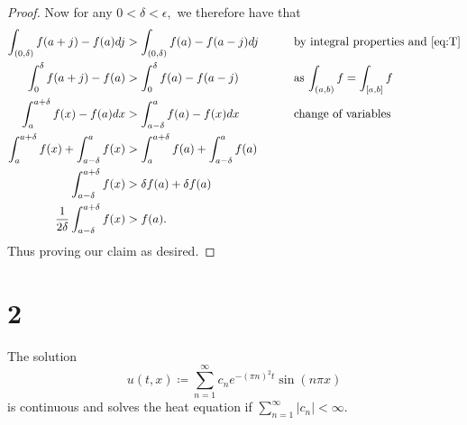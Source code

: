 \documentclass[10pt]{article}
\begin{document}
\begin{proof}
    Now for any $0<\delta<\epsilon,$ we therefore have that
    \begin{alignat*}{2}
        \int_{(0,\delta)}  f(a+j) - f(a) dj &> \int_{(0,\delta)}  f(a) - f(a-j) dj \qquad&&\text{by integral properties and \eqref{eq:T}}\\
        \int_{0}^{\delta}  f(a+j) - f(a) &> \int_{0}^{\delta}  f(a) - f(a-j) &&\text{as $\int_{(a,b)}f=\int_{[a,b]}f$}\\
        \int_{a}^{a+\delta} f(x) - f(a) dx&> \int_{a-\delta}^{a} f(a) - f(x) dx&&\text{change of variables}\\
        \int_{a}^{a+\delta} f(x) + \int_{a-\delta}^{a} f(x) &>  \int_{a}^{a+\delta} f(a) + \int_{a-\delta}^{a} f(a)\\
        \int_{a-\delta}^{a+\delta}f(x) &> \delta f(a) + \delta f(a)\\
        \frac{1}{2\delta}\int_{a-\delta}^{a+\delta}f(x) &> f(a).
    \end{alignat*}
    Thus proving our claim as desired.

\end{proof}
\newpage

\section*{2}
The solution
\begin{equation} \label{eq:def}
    u(t,x) \coloneqq \sum_{n=1}^{\infty}c_ne^{-(\pi n)^2t}\sin(n\pi x)
\end{equation}
is continuous and solves the heat equation if $\sum_{n=1}^{\infty}|c_n|<\infty$.\\
\end{document}
